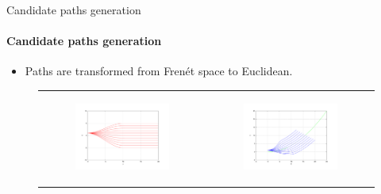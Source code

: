 \begin{frame}{Candidate paths generation}
  \framesubtitle{Candidate paths generation}
    
  \begin{itemize}
   \item Paths are transformed from Frenét space to Euclidean.
  \end{itemize}

  \begin{figure}
    \centering
    \begin{tabular}{cc}
      \begin{subfigure}[b]{0.3\textwidth}
	\centering
	\includegraphics[height=0.3\textheight, trim=50 40 80 60,clip]{frenet0}
      \end{subfigure} &
      \begin{subfigure}[b]{0.3\textwidth}
	\centering
	\includegraphics[height=0.3\textheight, trim=50 40 80 60,clip]{cartesian0}
      \end{subfigure}%
    \end{tabular}
  \end{figure}


\end{frame}
